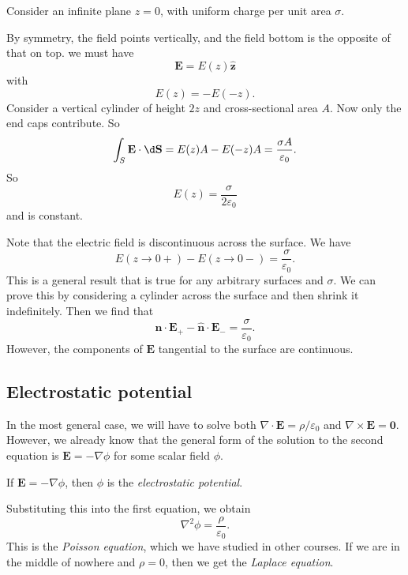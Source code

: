 \documentclass[a4paper]{article}
\begin{document}
\begin{eg}
  Consider an infinite plane $z = 0$, with uniform charge per unit area $\sigma$.
  \begin{center}
  \end{center}
  By symmetry, the field points vertically, and the field bottom is the opposite of that on top. we must have
  \[
    \mathbf{E} = E(z)\hat{\mathbf{z}}
  \]
  with
  \[
    E(z) = -E(-z).
  \]
  Consider a vertical cylinder of height $2z$ and cross-sectional area $A$. Now only the end caps contribute. So
  \[
    \int_S \mathbf{E} \cdot \d \mathbf{S} = E(z) A - E(-z) A =\frac{\sigma A}{\varepsilon _0}.
  \]
  So
  \[
    E(z) = \frac{\sigma }{2\varepsilon_0}
  \]
  and is constant.

  Note that the electric field is discontinuous across the surface. We have
  \[
    E(z\to 0+) - E(z\to 0-) = \frac{\sigma}{\varepsilon_0}.
  \]
  This is a general result that is true for any arbitrary surfaces and $\sigma$. We can prove this by considering a cylinder across the surface and then shrink it indefinitely. Then we find that
  \[
    \hat{\mathbf{n}}\cdot \mathbf{E}_+ - \hat{\mathbf{n}}\cdot \mathbf{E}_- = \frac{\sigma}{\varepsilon_0}.
  \]
  However, the components of $\mathbf{E}$ tangential to the surface are continuous.
\end{eg}

\subsection{Electrostatic potential}
In the most general case, we will have to solve both $\nabla \cdot \mathbf{E} = \rho/\varepsilon_0$ and $\nabla \times \mathbf{E} = \mathbf{0}$. However, we already know that the general form of the solution to the second equation is $\mathbf{E} = -\nabla\phi$ for some scalar field $\phi$.
\begin{defi}
  If $\mathbf{E} = -\nabla \phi$, then $\phi$ is the \emph{electrostatic potential}.
\end{defi}
Substituting this into the first equation, we obtain
\[
  \nabla^2\phi = \frac{\rho}{\varepsilon_0}.
\]
This is the \emph{Poisson equation}, which we have studied in other courses. If we are in the middle of nowhere and $\rho = 0$, then we get the \emph{Laplace equation}.
\end{document}
